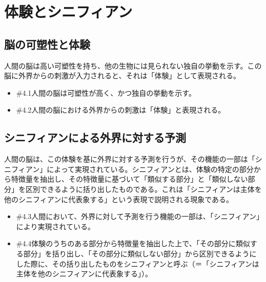 \section{体験とシニフィアン}\label{ux4f53ux9a13ux3068ux30b7ux30cbux30d5ux30a3ux30a2ux30f3}

\subsection{脳の可塑性と体験}\label{ux8133ux306eux53efux5851ux6027ux3068ux4f53ux9a13}

人間の脳は高い可塑性を持ち、他の生物には見られない独自の挙動を示す。この脳に外界からの刺激が入力されると、それは「体験」として表現される。

\begin{note}{}
  \begin{itemize}
    \tightlist
    \item{\#4.1}人間の脳は可塑性が高く、かつ独自の挙動を示す。
    \item{\#4.2}人間の脳における外界からの刺激は「体験」と表現される。
  \end{itemize}
\end{note}

\subsection{シニフィアンによる外界に対する予測}\label{ux30b7ux30cbux30d5ux30a3ux30a2ux30f3ux306bux3088ux308bux5916ux754cux306bux5bfeux3059ux308bux4e88ux6e2c}

人間の脳は、この体験を基に外界に対する予測を行うが、その機能の一部は「シニフィアン」によって実現されている。シニフィアンとは、体験の特定の部分から特徴量を抽出し、その特徴量に基づいて「類似する部分」と「類似しない部分」を区別できるように括り出したものである。これは「シニフィアンは主体を他のシニフィアンに代表象する」という表現で説明される現象である。

\begin{note}{}
  \begin{itemize}
    \tightlist
    \item{\#4.3}人間において、外界に対して予測を行う機能の一部は、「シニフィアン」により実現されている。
    \item{\#4.4}体験のうちのある部分から特徴量を抽出した上で、「その部分に類似する部分」を括り出し、「その部分に類似しない部分」から区別できるようにした際に、その括り出したものをシニフィアンと呼ぶ（＝「シニフィアンは主体を他のシニフィアンに代表象する」）。
  \end{itemize}
\end{note}


